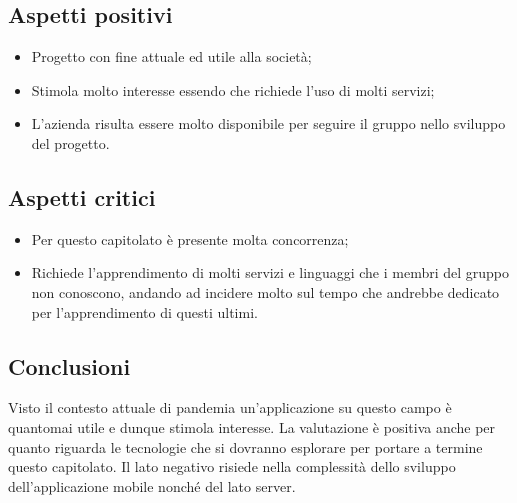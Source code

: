 \subsection{Aspetti positivi}
\begin{itemize}
\item	Progetto con fine attuale ed utile alla società;
\item	Stimola molto interesse essendo che richiede l'uso di molti servizi;
\item	L'azienda risulta essere molto disponibile per seguire il gruppo nello sviluppo del progetto.
\end{itemize}
\subsection{Aspetti critici}
\begin{itemize}
\item	Per questo capitolato è presente molta concorrenza;
\item	Richiede l'apprendimento di molti servizi e linguaggi che i membri del gruppo non conoscono, andando ad incidere molto sul tempo che andrebbe dedicato per l'apprendimento di questi ultimi.
\end{itemize}

\subsection{Conclusioni}
Visto il contesto attuale di pandemia un'applicazione su questo campo è quantomai utile e dunque stimola interesse. La valutazione è positiva anche per quanto riguarda le tecnologie che si dovranno esplorare per portare a termine questo capitolato. Il lato negativo risiede nella complessità dello sviluppo dell'applicazione mobile nonché del lato server. 
